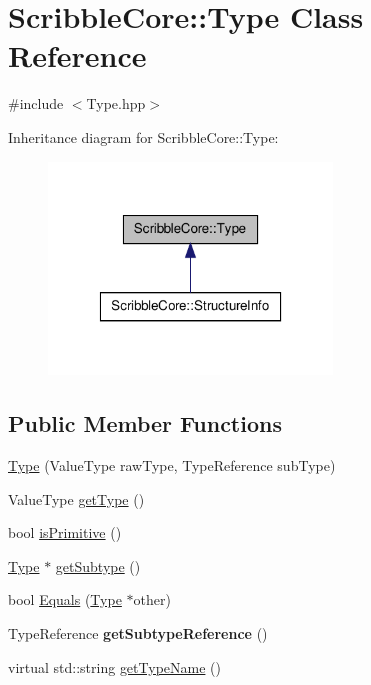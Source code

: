 \hypertarget{class_scribble_core_1_1_type}{\section{Scribble\-Core\-:\-:Type Class Reference}
\label{class_scribble_core_1_1_type}
}


{\ttfamily \#include $<$Type.\-hpp$>$}



Inheritance diagram for Scribble\-Core\-:\-:Type\-:\nopagebreak
\begin{figure}[H]
\begin{center}
\leavevmode
\includegraphics[width=214pt]{class_scribble_core_1_1_type__inherit__graph}
\end{center}
\end{figure}
\subsection*{Public Member Functions}
\begin{DoxyCompactItemize}
\item 
\hyperlink{class_scribble_core_1_1_type_a2d6f4b2fd9cfe25e15441e8d7b441710}{Type} (Value\-Type raw\-Type, Type\-Reference sub\-Type)
\item 
Value\-Type \hyperlink{class_scribble_core_1_1_type_a7b465695c97c0e07457f46c7ac18a96c}{get\-Type} ()
\item 
bool \hyperlink{class_scribble_core_1_1_type_ae3668b9dc9195516bfdeb9f2265d78a5}{is\-Primitive} ()
\item 
\hyperlink{class_scribble_core_1_1_type}{Type} $\ast$ \hyperlink{class_scribble_core_1_1_type_a65ef83531886c3aba0f7f7e89caaeaf1}{get\-Subtype} ()
\item 
bool \hyperlink{class_scribble_core_1_1_type_add26d29b25d99be9bc7f769e53539c24}{Equals} (\hyperlink{class_scribble_core_1_1_type}{Type} $\ast$other)
\item 
\hypertarget{class_scribble_core_1_1_type_ad0f401473ee20d081314cd3f7fbe1739}{Type\-Reference {\bfseries get\-Subtype\-Reference} ()}\label{class_scribble_core_1_1_type_ad0f401473ee20d081314cd3f7fbe1739}

\item 
virtual std\-::string \hyperlink{class_scribble_core_1_1_type_aa3eeef0216f910c6a2ae8047336b51f1}{get\-Type\-Name} ()
\end{DoxyCompactItemize}


